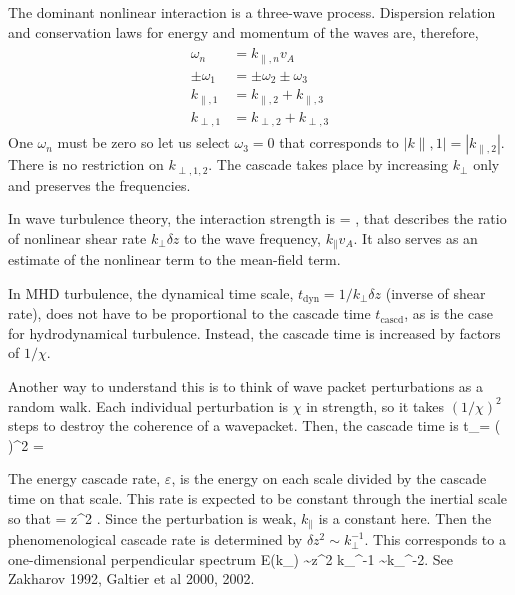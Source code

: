 \documentclass[usenatbib,twocolumn, twocolappendix]{aastex63}
\newcommand{\tcascd}{t_\mathrm{cascd}} %
\begin{document}
The dominant nonlinear interaction is a three-wave process.
Dispersion relation and conservation laws for energy and momentum of the waves are, therefore,
\begin{align}\begin{split}
    \omega_n &= k_{\parallel,n} v_A \\
    \pm \omega_1 &= \pm \omega_2 \pm \omega_3 \\
    k_{\parallel,1} &= k_{\parallel,2} + k_{\parallel,3} \\
    k_{\perp,1} &= k_{\perp,2} + k_{\perp,3} 
\end{split}\end{align}
One $\omega_n$ must be zero so let us select $\omega_3=0$ that corresponds to $|k{\parallel,1}| = |k_{\parallel,2}|$.
There is no restriction on $k_{\perp,1,2}$.
The cascade takes place by increasing $k_\perp$ only and preserves the frequencies.

In wave turbulence theory, the interaction strength is
\be
\chi = ,
\ee
that describes the ratio of nonlinear shear rate $k_\perp \delta z$ to the wave frequency, $k_\parallel v_A$.
It also serves as an estimate of the nonlinear term to the mean-field term.

In MHD turbulence, the dynamical time scale, $t_\mathrm{dyn} = 1/k_\perp \delta z$ (inverse of shear rate), does not have to be proportional to the cascade time $\tcascd$, as is the case for hydrodynamical turbulence.
Instead, the cascade time is increased by factors of $1/\chi$.

Another way to understand this is to think of wave packet perturbations as a random walk.
Each individual perturbation is $\chi$ in strength, so it takes $(1/\chi)^2$ steps to destroy the coherence of a wavepacket.
Then, the cascade time is
\be
\tcascd =  \left(  \right)^2 = 
\ee

The energy cascade rate, $\varepsilon$, is the energy on each scale divided by the cascade time on that scale.
This rate is expected to be constant through the inertial scale so that
\be
\epsilon = \delta z^2 .
\ee
Since the perturbation is weak, $k_\parallel$ is a constant here.
Then the phenomenological cascade rate is determined by $\delta z^2 \sim k_\perp^{-1}$.
This corresponds to a one-dimensional perpendicular spectrum
\be
E(k_\perp) \sim \delta z^2 k_\perp^{-1} \sim k_\perp^{-2}.
\ee
See Zakharov 1992, Galtier et al 2000, 2002.
\end{document}
